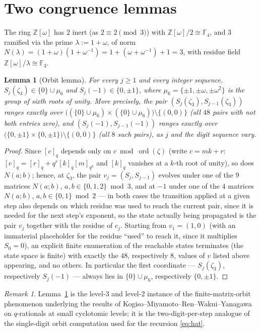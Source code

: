 \documentclass[11pt]{article}
\newtheorem{lemma}[theorem]{Lemma}
\theoremstyle{remark}
\newtheorem{remark}[theorem]{Remark}
\newcommand{\Z}{\mathbb{Z}}
\newcommand{\F}{\mathbb{F}}
\newcommand{\qint}[1]{[#1]_q}
\begin{document}
\section{Two congruence lemmas}

The ring $\Z[\omega]$ has $2$ inert (as $2\equiv2\pmod3$) with $\Z[\omega]/2\cong\F_4$, and $3$
ramified via the prime $\lambda:=1+\omega$, of norm
$N(\lambda)=(1+\omega)(1+\omega^{-1})=1+(\omega+\omega^{-1})+1=3$, with residue field
$\Z[\omega]/\lambda\cong\F_3$.

\begin{lemma}[Orbit lemma]\label{lem:orbit}
For every $j\ge1$ and every integer sequence, $S_j(\zeta_3)\in\{0\}\cup\mu_6$ and
$S_j(-1)\in\{0,\pm1\}$, where $\mu_6=\{\pm1,\pm\omega,\pm\omega^2\}$ is the group of sixth
roots of unity. More precisely, the pair $(S_j(\zeta_3),S_{j-1}(\zeta_3))$ ranges exactly over
$\big((\{0\}\cup\mu_6)\times(\{0\}\cup\mu_6)\big)\setminus\{(0,0)\}$ (all $48$ pairs with not
both entries zero), and $(S_j(-1),S_{j-1}(-1))$ ranges exactly over
$\big(\{0,\pm1\}\times\{0,\pm1\}\big)\setminus\{(0,0)\}$ (all $8$ such pairs), as $j$ and the
digit sequence vary.
\end{lemma}

\begin{proof}
Since $\qint{c}$ depends only on $c\bmod\operatorname{ord}(\zeta)$ (write $c=mk+r$: $\qint c=
\qint r+q^r\qint k[m]_{q^k}$ and $\qint k$ vanishes at a $k$-th root of unity), so does
$N(a;b)$; hence, at $\zeta_3$, the pair $v_j=(S_j,S_{j-1})$ evolves under one of the $9$
matrices $N(a;b)$, $a,b\in\{0,1,2\}\bmod3$, and at $-1$ under one of the $4$ matrices $N(a;b)$,
$a,b\in\{0,1\}\bmod2$ --- in both cases the transition applied at a given step also depends on
which residue was used to reach the current pair, since it is needed for the next step's
exponent, so the state actually being propagated is the pair $v_j$ together with the residue of
$c_j$. Starting from $v_1=(1,0)$ (with an immaterial placeholder for the residue ``used'' to
reach it, since it multiplies $S_0=0$), an explicit finite enumeration of the reachable states
terminates (the state space is finite) with exactly the $48$, respectively $8$, values of $v$
listed above appearing, and no others. In particular the first coordinate --- $S_j(\zeta_3)$,
respectively $S_j(-1)$ --- always lies in $\{0\}\cup\mu_6$, respectively $\{0,\pm1\}$.
\end{proof}

\begin{remark}
Lemma~\ref{lem:orbit} is the level-$3$ and level-$2$ instance of the finite-matrix-orbit
phenomenon underlying the results of Kogiso--Miyamoto--Ren--Wakui--Yanagawa \cite{KMRWY} on
$q$-rationals at small cyclotomic levels; it is the two-digit-per-step analogue of the
single-digit orbit computation used for the recursion \eqref{eq:hat}.
\end{remark}
\end{document}
